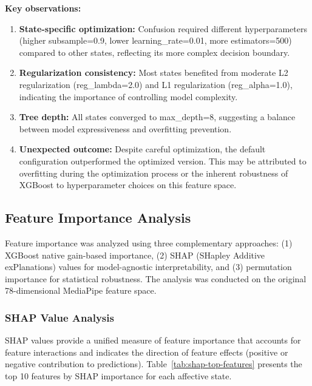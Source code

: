 \textbf{Key observations:}
\begin{enumerate}
    \item \textbf{State-specific optimization:} Confusion required different hyperparameters (higher subsample=0.9, lower learning\_rate=0.01, more estimators=500) compared to other states, reflecting its more complex decision boundary.

    \item \textbf{Regularization consistency:} Most states benefited from moderate L2 regularization (reg\_lambda=2.0) and L1 regularization (reg\_alpha=1.0), indicating the importance of controlling model complexity.

    \item \textbf{Tree depth:} All states converged to max\_depth=8, suggesting a balance between model expressiveness and overfitting prevention.

    \item \textbf{Unexpected outcome:} Despite careful optimization, the default configuration outperformed the optimized version. This may be attributed to overfitting during the optimization process or the inherent robustness of XGBoost to hyperparameter choices on this feature space.
\end{enumerate}

\subsection{Feature Importance Analysis}
\label{sec:feature-importance}

Feature importance was analyzed using three complementary approaches: (1) XGBoost native gain-based importance, (2) SHAP (SHapley Additive exPlanations) values for model-agnostic interpretability, and (3) permutation importance for statistical robustness. The analysis was conducted on the original 78-dimensional MediaPipe feature space.

\subsubsection{SHAP Value Analysis}
\label{sec:shap-analysis}

SHAP values provide a unified measure of feature importance that accounts for feature interactions and indicates the direction of feature effects (positive or negative contribution to predictions). Table~\ref{tab:shap-top-features} presents the top 10 features by SHAP importance for each affective state.

